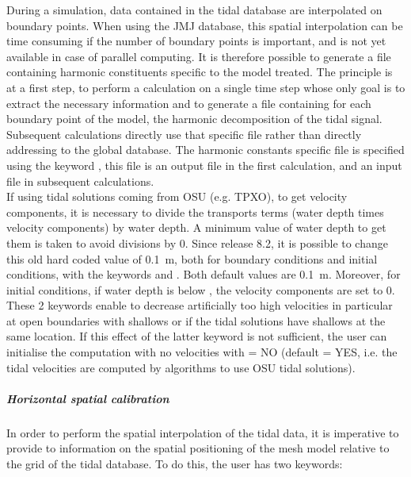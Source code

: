 During a simulation, data contained in the tidal database are interpolated
on boundary points.
When using the JMJ database, this spatial interpolation can be time consuming
if the number of boundary points is important, and is not yet available in case
of parallel computing.
It is therefore possible to generate a file containing harmonic constituents
specific to the model treated.
The principle is at a first step, to perform a calculation on a single time step
whose only goal is to extract the necessary information and to generate a file
containing for each boundary point of the model, the harmonic decomposition of
the tidal signal.
Subsequent calculations directly use that specific file rather than directly
addressing to the global database.
The harmonic constants specific file is specified using the keyword
, this file is an output file in the first
calculation, and an input file in subsequent calculations.
\\

If using tidal solutions coming from OSU (e.g. TPXO), to get velocity
components, it is necessary to divide the transports terms
(water depth times velocity components) by water depth.
A minimum value of water depth to get them is taken to avoid divisions by 0.
Since release 8.2, it is possible to change this old hard coded value of 0.1~m,
both for boundary conditions and initial conditions, with the keywords
 and
.
Both default values are 0.1~m.
Moreover, for initial conditions, if water depth is below 
,
the velocity components are set to 0.
These 2 keywords enable to decrease artificially too high velocities
in particular at open boundaries with shallows or if the tidal solutions
have shallows at the same location.
If this effect of the latter keyword is not sufficient,
the user can initialise the computation with no velocities with
 = NO (default = YES, i.e. the
tidal velocities are computed by algorithms to use OSU tidal solutions).


\subparagraph{Horizontal spatial calibration}

In order to perform the spatial interpolation of the tidal data,
it is imperative to provide to  information on the spatial
positioning of the mesh model relative to the grid of the tidal database.
To do this, the user has two keywords:

